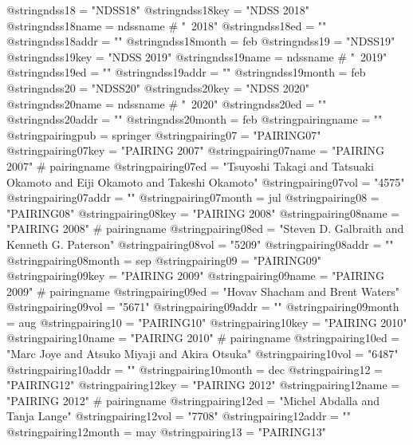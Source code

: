 @string{ndss18 =                "NDSS18"}
@string{ndss18key =             "NDSS 2018"}
@string{ndss18name =            ndssname # "~2018"}
@string{ndss18ed =              ""}
@string{ndss18addr =            ""}
@string{ndss18month =           feb}
@string{ndss19 =                "NDSS19"}
@string{ndss19key =             "NDSS 2019"}
@string{ndss19name =            ndssname # "~2019"}
@string{ndss19ed =              ""}
@string{ndss19addr =            ""}
@string{ndss19month =           feb}
@string{ndss20 =                "NDSS20"}
@string{ndss20key =             "NDSS 2020"}
@string{ndss20name =            ndssname # "~2020"}
@string{ndss20ed =              ""}
@string{ndss20addr =            ""}
@string{ndss20month =           feb}
@string{pairingname =           ""}
@string{pairingpub =            springer}
@string{pairing07 =             "PAIRING07"}
@string{pairing07key =          "PAIRING 2007"}
@string{pairing07name =         "PAIRING 2007" # pairingname}
@string{pairing07ed =           "Tsuyoshi Takagi and Tatsuaki Okamoto and Eiji Okamoto and Takeshi Okamoto"}
@string{pairing07vol =          "4575"}
@string{pairing07addr =         ""}
@string{pairing07month =        jul}
@string{pairing08 =             "PAIRING08"}
@string{pairing08key =          "PAIRING 2008"}
@string{pairing08name =         "PAIRING 2008" # pairingname}
@string{pairing08ed =           "Steven D. Galbraith and Kenneth G. Paterson"}
@string{pairing08vol =          "5209"}
@string{pairing08addr =         ""}
@string{pairing08month =        sep}
@string{pairing09 =             "PAIRING09"}
@string{pairing09key =          "PAIRING 2009"}
@string{pairing09name =         "PAIRING 2009" # pairingname}
@string{pairing09ed =           "Hovav Shacham and Brent Waters"}
@string{pairing09vol =          "5671"}
@string{pairing09addr =         ""}
@string{pairing09month =        aug}
@string{pairing10 =             "PAIRING10"}
@string{pairing10key =          "PAIRING 2010"}
@string{pairing10name =         "PAIRING 2010" # pairingname}
@string{pairing10ed =           "Marc Joye and Atsuko Miyaji and Akira Otsuka"}
@string{pairing10vol =          "6487"}
@string{pairing10addr =         ""}
@string{pairing10month =        dec}
@string{pairing12 =             "PAIRING12"}
@string{pairing12key =          "PAIRING 2012"}
@string{pairing12name =         "PAIRING 2012" # pairingname}
@string{pairing12ed =           "Michel Abdalla and Tanja Lange"}
@string{pairing12vol =          "7708"}
@string{pairing12addr =         ""}
@string{pairing12month =        may}
@string{pairing13 =             "PAIRING13"}
